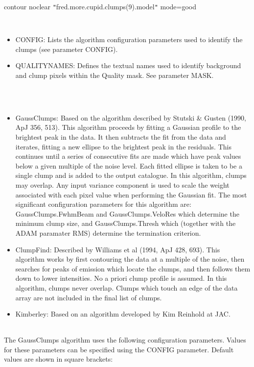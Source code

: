 \documentclass[twoside,11pt]{article}
\renewcommand{\_}{\texttt{\symbol{95}}}
\newcommand{\sstdiytopic}[2]{\item[{\hspace{-0.35em}#1\hspace{-0.35em}:}]
\mbox{} \\[1.3ex] #2}
\newcommand{\sstitemlist}[1]{
  \mbox{} \\
  \vspace{-3.5ex}
  \begin{itemize}
     #1
  \end{itemize}
}
\newcommand{\sstitem}{\item}
\newcommand{\sstdiytopic}[2]{\item[{#1}] #2 }
\newcommand{\sstitemlist}[1]{
      \begin{itemize}
         #1
      \end{itemize}
      \\
   }
\newcommand{\sstitem}{\item}
\begin{document}
{{{      }
      contour noclear {\tt "}fred.more.cupid.clumps(9).model{\tt "} mode=good

      \sstitemlist{

         \sstitem
         CONFIG: Lists the algorithm configuration parameters used to
         identify the clumps (see parameter CONFIG).

         \sstitem
         QUALITY\_NAMES: Defines the textual names used to identify background
         and clump pixels within the Quality mask. See parameter MASK.
      }
   }
   \sstdiytopic{
      Algorithms
   }{
      \sstitemlist{

         \sstitem
         GaussClumps: Based on the algorithm described by Stutski \& Gusten
         (1990, ApJ 356, 513). This algorithm proceeds by fitting a Gaussian
         profile to the brightest peak in the data. It then subtracts the fit
         from the data and iterates, fitting a new ellipse to the brightest peak
         in the residuals. This continues until a series of consecutive fits
         are made which have peak values below a given multiple of the noise
         level. Each fitted ellipse is taken to be a single clump and is added
         to the output catalogue. In this algorithm, clumps may overlap. Any
         input variance component is used to scale the weight associated with
         each pixel value when performing the Gaussian fit. The most significant
         configuration parameters for this algorithm are: GaussClumps.FwhmBeam
         and GaussClumps.VeloRes which determine the minimum clump size, and
         GaussClumps.Thresh which (together with the ADAM paramater RMS)
         determine the termination criterion.

         \sstitem
         ClumpFind: Described by Williams et al (1994, ApJ 428, 693). This
         algorithm works by first contouring the data at a multiple of the
         noise, then searches for peaks of emission which locate the clumps,
         and then follows them down to lower intensities. No a priori clump
         profile is assumed. In this algorithm, clumps never overlap. Clumps
         which touch an edge of the data array are not included in the final
         list of clumps.

         \sstitem
         Kimberley: Based on an algorithm developed by Kim Reinhold at JAC.
      }
   }
   \sstdiytopic{
      GaussClumps Configuration Parameters
   }{
      The GaussClumps algorithm uses the following configuration parameters.
      Values for these parameters can be specified using the CONFIG parameter.
      Default values are shown in square brackets:

}}
\end{document}
